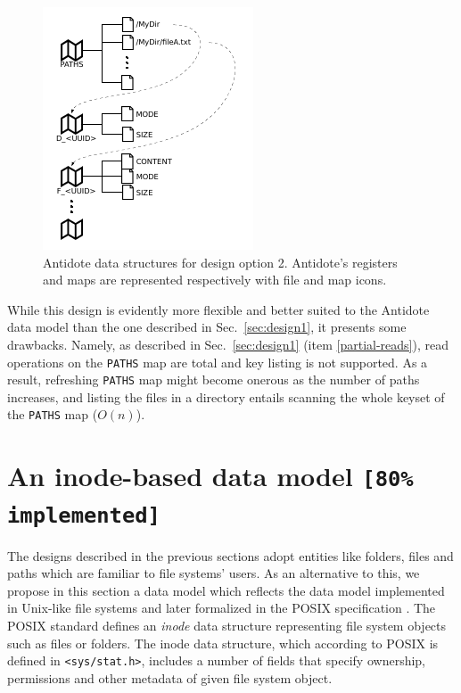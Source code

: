\documentclass[11pt]{article}
\newcommand{\status}[1]{{\texttt{\footnotesize [#1]}}}
\newcommand{\PATHS}{\texttt{PATHS}\xspace}
\begin{document}
\begin{figure}
	\centering
	\includegraphics[scale=1.2]{design-2.pdf}
	\caption{Antidote data structures for design option 2. %
		Antidote's registers and maps are represented 
		respectively with file and map icons.}
	\label{fig:design2}
\end{figure}

While this design is evidently more flexible and better suited to the Antidote data model 
than the one described in Sec.~\ref{sec:design1}, 
it presents some drawbacks.
Namely, as described in Sec.~\ref{sec:design1} (item \ref{partial-reads}), 
read operations on the \PATHS map are total and key listing is not supported.
As a result, refreshing \PATHS map might become onerous as the 
number of paths increases, and listing the files in a directory entails 
scanning the whole keyset of the \PATHS map ($O(n)$).




\section{An inode-based data model \status{80\% implemented}}
\label{sec:design3}
The designs described in the previous sections adopt entities 
like folders, files and paths which are familiar to file systems' users.
As an alternative to this, we propose in this section
a data model which reflects the data model implemented in Unix-like 
file systems and later formalized in the POSIX specification \cite{posix}.
The POSIX standard defines an \textit{inode} data structure
representing file system objects such as files or folders.
The inode data structure, 
which according to POSIX is defined in \texttt{\textless sys/stat.h\textgreater},
includes a number of fields that specify 
ownership, permissions and other metadata of given file system object.
\end{document}
